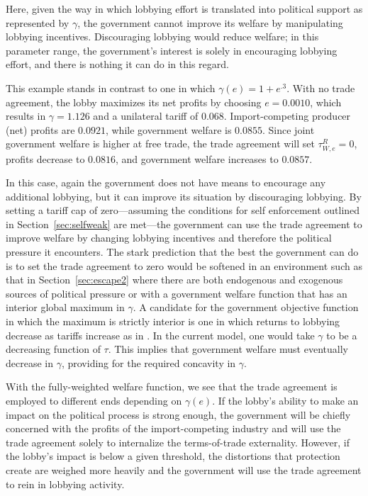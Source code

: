 \documentclass[12pt]{article}
\newcommand{\ga}{\gamma}
\begin{document}
Here, given the way in which lobbying effort is translated into political support as represented by $\ga$, the government cannot improve its welfare by manipulating lobbying incentives. Discouraging lobbying would reduce welfare; in this parameter range, the government's interest is solely in encouraging lobbying effort, and there is nothing it can do in this regard.


This example stands in contrast to one in which $\ga(e) = 1 + e^{.3}$. With no trade agreement, the lobby maximizes its net profits by choosing $e=0.0010$, which results in $\ga=1.126$ and a unilateral tariff of $0.068$. Import-competing producer (net) profits are $0.0921$, while government welfare is $0.0855$. Since joint government welfare is higher at free trade, the trade agreement will set $\tau^R_{W,e}=0$, profits decrease to $0.0816$, and government welfare increases to $0.0857$.

In this case, again the government does not have means to encourage any additional lobbying, but it can improve its situation by discouraging lobbying. By setting a tariff cap of zero---assuming the conditions for self enforcement outlined in Section~\ref{sec:selfweak} are met---the government can use the trade agreement to improve welfare by changing lobbying incentives and therefore the political pressure it encounters. The stark prediction that the best the government can do is to set the trade agreement to zero would be softened in an environment such as that in Section~\ref{sec:escape2} where there are both endogenous and exogenous sources of political pressure or with a government welfare function that has an interior global maximum in $\ga$. A candidate for the government objective function in which the maximum is strictly interior is one in which returns to lobbying decrease as tariffs increase as in \Textcite{ethier2012}. In the current model, one would take $\ga$ to be a decreasing function of $\tau$. This implies that government welfare must eventually decrease in $\ga$, providing for the required concavity in $\ga$. 

With the fully-weighted welfare function, we see that the trade agreement is employed to different ends depending on $\ga(e)$. If the lobby's ability to make an impact on the political process is strong enough, the government will be chiefly concerned with the profits of the import-competing industry and will use the trade agreement solely to internalize the terms-of-trade externality. However, if the lobby's impact is below a given threshold, the distortions that protection create are weighed more heavily and the government will use the trade agreement to rein in lobbying activity.
\end{document}
